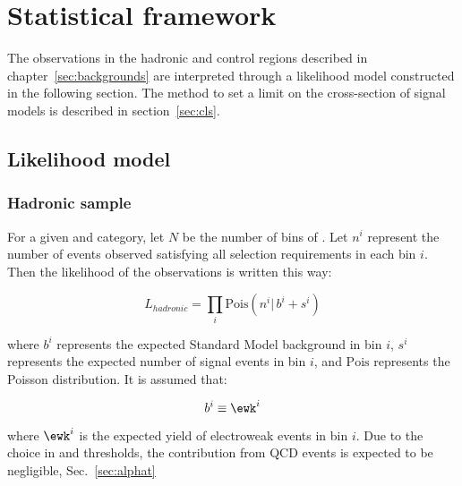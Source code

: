 \clearpage
\section{Statistical framework}
\label{sec:statistics}
The observations in the hadronic and control regions described in 
chapter~\ref{sec:backgrounds} are interpreted through a likelihood model 
constructed in the following section. The method to set a limit on the 
cross-section of signal models is described in section~\ref{sec:cls}. 

\subsection{Likelihood model\label{likelihood}}

\subsubsection{Hadronic sample}
\label{sec:hadronicLikelihood}

For a given \njet and \nb category, 
let $N$ be the number of bins of \HT. Let $n^i$ represent 
the number of events observed satisfying all selection requirements 
in each \HT bin $i$.  Then the likelihood of
the observations is written this way:

\begin{equation}
L_{hadronic}=\prod_i \mathrm{Pois}(n^i |\, b^i + s^i)
\label{eq:hadronicLikelihood}
\end{equation}

where $b^i$ represents the expected Standard Model background in bin
$i$, $s^i$ represents the expected number of signal events in bin $i$,
and $\mathrm{Pois}$ represents the Poisson distribution.  It is
assumed that:

\begin{equation}
  b^i\equiv \ewk^i
  \label{eq:ewkTotal}
\end{equation}

where $\ewk^i$ is the expected yield of electroweak events in bin $i$.
Due to the choice in \alphat and \scalht thresholds, the contribution 
from QCD events is expected to be negligible, Sec.~\ref{sec:alphat}


